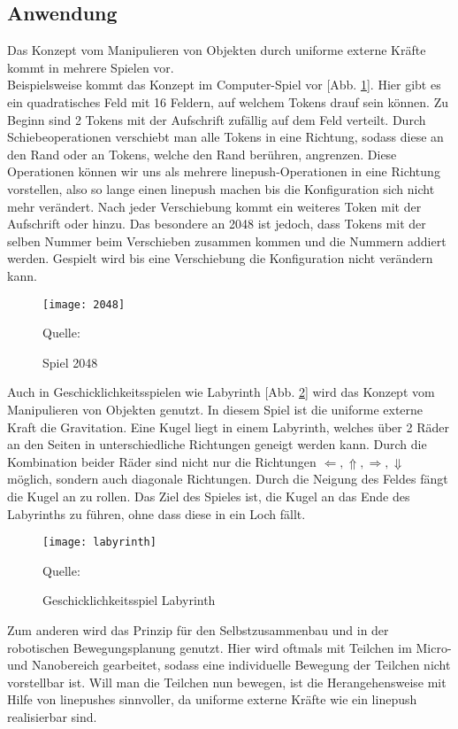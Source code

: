 \documentclass[seminar,german]{algothesis}
\newcommand*{\quelle}{%
  \footnotesize Quelle:
}
\begin{document}
\subsection{Anwendung}
Das Konzept vom Manipulieren von Objekten durch uniforme externe Kräfte kommt in mehrere Spielen vor.\\
Beispielsweise kommt das Konzept im Computer-Spiel \grqq{} vor [Abb. \ref{fig:2}]. Hier gibt es ein quadratisches Feld mit 16 Feldern, auf welchem Tokens drauf sein können. Zu Beginn sind 2 Tokens mit der Aufschrift \grqq{} zufällig auf dem Feld verteilt. Durch Schiebeoperationen verschiebt man alle Tokens in eine Richtung, sodass diese an den Rand oder an Tokens, welche den Rand berühren, angrenzen. Diese Operationen können wir uns als mehrere linepush-Operationen in eine Richtung vorstellen, also so lange einen linepush machen bis die Konfiguration sich nicht mehr verändert. Nach jeder Verschiebung kommt ein weiteres Token mit der Aufschrift \grqq{} oder \grqq{} hinzu. Das besondere an 2048 ist jedoch, dass Tokens mit der selben Nummer beim Verschieben zusammen kommen und die Nummern addiert werden. Gespielt wird bis eine Verschiebung die Konfiguration nicht verändern kann.


\begin{figure}[ht]
	\centering
	\texttt{[image: 2048]}
	\caption{Spiel 2048}
	\quelle\cite{2048}
	\label{fig:2}
\end{figure}

\noindent
Auch in Geschicklichkeitsspielen wie \glqq Labyrinth\grqq{} [Abb. \ref{fig:lab}] wird das Konzept vom Manipulieren von Objekten genutzt. In diesem Spiel ist die uniforme externe Kraft die Gravitation. Eine Kugel liegt in einem Labyrinth, welches über 2 Räder an den Seiten in unterschiedliche Richtungen geneigt werden kann. Durch die Kombination beider Räder sind nicht nur die Richtungen $\Leftarrow, \Uparrow, \Rightarrow, \Downarrow$ möglich, sondern auch diagonale Richtungen. Durch die Neigung des Feldes fängt die Kugel an zu rollen. Das Ziel des Spieles ist, die Kugel an das Ende des Labyrinths zu führen, ohne dass diese in ein Loch fällt.


\begin{figure}[ht]
	\centering
	\texttt{[image: labyrinth]}
	\caption{Geschicklichkeitsspiel Labyrinth}
	\quelle\cite{labyrinth}
	\label{fig:lab}
\end{figure}
\newpage
\noindent
Zum anderen wird das Prinzip für den Selbstzusammenbau und in der robotischen Bewegungsplanung genutzt. Hier wird oftmals mit Teilchen im Micro- und Nanobereich gearbeitet, sodass eine individuelle Bewegung der Teilchen nicht vorstellbar ist. Will man die Teilchen nun bewegen, ist die Herangehensweise mit Hilfe von linepushes sinnvoller, da uniforme externe Kräfte wie ein linepush realisierbar sind.
\end{document}
